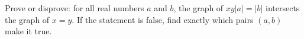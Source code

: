 Prove or disprove: for all real numbers $a$ and $b$, the graph of $xy|a|=|b|$ intersects the graph of $x=y$. If the statement is false, find exactly which pairs $(a,b)$ make it true.
